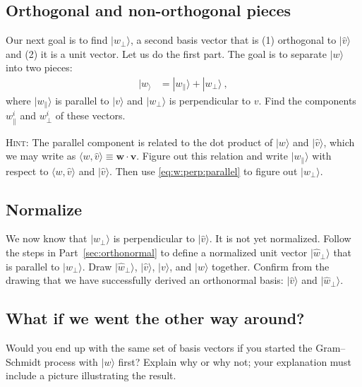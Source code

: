 \documentclass[12pt]{article}
\numberwithin{equation}{section}    %
\renewcommand{\vec}[1]{\mathbf{#1}} %
\begin{document}
\subsection{Orthogonal and non-orthogonal pieces}\label{sec:orthogonal}

Our next goal is to find $|\hat w_\perp\rangle$, a second basis vector that is (1) orthogonal to $|\hat v\rangle$ and (2) it is a unit vector. Let us do the first part. The goal is to separate $|w \rangle$ into two pieces:
\begin{align}
	|w_\rangle &= |w_\parallel\rangle + |w_\perp\rangle \ ,
	\label{eq:w:perp:parallel}
\end{align}
where $|w_\parallel\rangle$ is parallel to $|v\rangle$ and $|w_\perp\rangle$ is perpendicular to $v$. Find the components $w_\parallel^i$ and $w_\perp^i$ of these vectors.

\textsc{Hint:} The parallel component is related to the dot product of $|w\rangle$ and $|\hat v\rangle$, which we may write as $\langle w,\hat v\rangle \equiv \vec{w}\cdot\hat{\vec{v}}$. Figure out this relation and write $|w_\parallel\rangle$ with respect to $\langle w, \hat{v}\rangle$ and $|\hat{v}\rangle$. Then use  \eqref{eq:w:perp:parallel} to figure out $|w_\perp\rangle$. 

\subsection{Normalize}

We now know that $|w_\perp\rangle$ is perpendicular to $|\hat v \rangle$. It is not yet normalized. Follow the steps in Part~\ref{sec:orthonormal} to define a normalized unit vector $|\hat w_\perp \rangle$ that is parallel to $|w_\perp\rangle$. Draw $|\hat w_\perp\rangle$, $|\hat v\rangle$, $|v\rangle$, and $|w\rangle$ together. Confirm from the drawing that we have successfully derived an orthonormal basis: $|\hat v\rangle$ and $|\hat w_\perp\rangle$.

\subsection{What if we went the other way around?}

Would you end up with the same set of basis vectors if you started the Gram--Schmidt process with $|w\rangle$ first? Explain why or why not; your explanation must include a picture illustrating the result.
\end{document}
